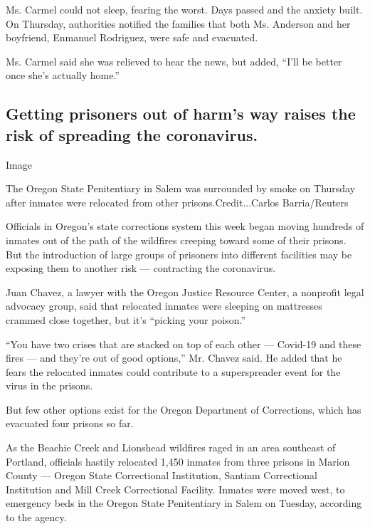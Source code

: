 Ms. Carmel could not sleep, fearing the worst. Days passed and the
anxiety built. On Thursday, authorities notified the families that both
Ms. Anderson and her boyfriend, Enmanuel Rodriguez, were safe and
evacuated.

Ms. Carmel said she was relieved to hear the news, but added, ``I'll be
better once she's actually home.''

\hypertarget{getting-prisoners-out-of-harms-way-raises-the-risk-of-spreading-the-coronavirus}{%
\subsection{Getting prisoners out of harm's way raises the risk of
spreading the
coronavirus.}\label{getting-prisoners-out-of-harms-way-raises-the-risk-of-spreading-the-coronavirus}}

Image

The Oregon State Penitentiary in Salem was surrounded by smoke on
Thursday after inmates were relocated from other prisons.Credit...Carlos
Barria/Reuters

Officials in Oregon's state corrections system this week began moving
hundreds of inmates out of the path of the wildfires creeping toward
some of their prisons. But the introduction of large groups of prisoners
into different facilities may be exposing them to another risk ---
contracting the coronavirus.

Juan Chavez, a lawyer with the Oregon Justice Resource Center, a
nonprofit legal advocacy group, said that relocated inmates were
sleeping on mattresses crammed close together, but it's ``picking your
poison.''

``You have two crises that are stacked on top of each other --- Covid-19
and these fires --- and they're out of good options,'' Mr. Chavez said.
He added that he fears the relocated inmates could contribute to a
superspreader event for the virus in the prisons.

But few other options exist for the Oregon Department of Corrections,
which has evacuated four prisons so far.

As the Beachie Creek and Lionshead wildfires raged in an area southeast
of Portland, officials hastily relocated 1,450 inmates from three
prisons in Marion County --- Oregon State Correctional Institution,
Santiam Correctional Institution and Mill Creek Correctional Facility.
Inmates were moved west, to emergency beds in the Oregon State
Penitentiary in Salem on Tuesday, according to the agency.

